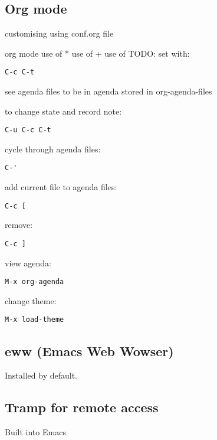 
\subsection{Org mode}

customising using conf.org file



org mode
use of *
use of +
use of TODO: set with:

\begin{verbatim}
C-c C-t
\end{verbatim}
see agenda
files to be in agenda stored in org-agenda-files

to change state and record note:
\begin{verbatim}
C-u C-c C-t
\end{verbatim}

cycle through agenda files:
\begin{verbatim}
C-'
\end{verbatim}

add current file to agenda files:
\begin{verbatim}
C-c [
\end{verbatim}

remove:
\begin{verbatim}
C-c ]
\end{verbatim}

view agenda:
\begin{verbatim}
M-x org-agenda
\end{verbatim}

change theme:
\begin{verbatim}
M-x load-theme
\end{verbatim}

\subsection{eww (Emacs Web Wowser)}

Installed by default.
\subsection{Tramp for remote access}

Built into Emacs
